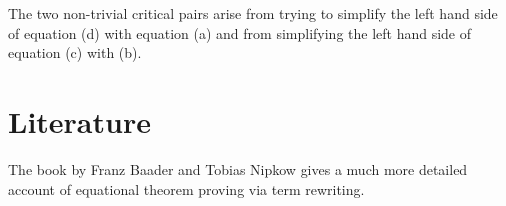 \hint 
The two non-trivial critical pairs arise from trying to simplify the left hand side of equation (d) with equation (a)
and from simplifying the left hand side of equation (c) with (b).
\eoxs
    
\section{Literature}
The book  by Franz Baader and Tobias Nipkow \cite{baader:1998} gives a much
more detailed account of equational theorem proving via term rewriting.

